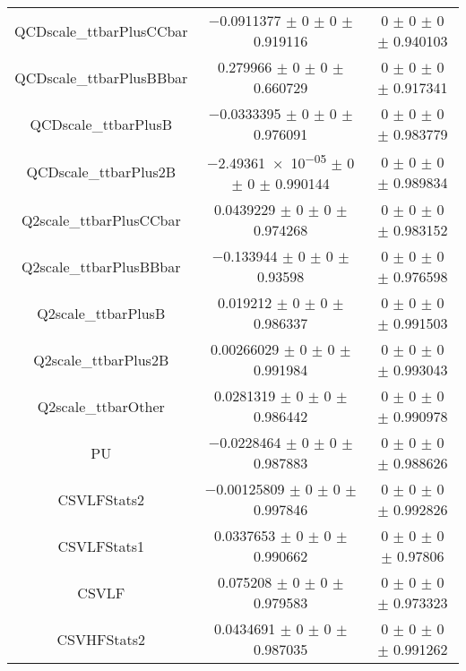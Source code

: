 \begin{table}
\begin{tabular}{ccc}
QCDscale\_ttbarPlusCCbar 	& \num{-0.0911377} $\pm$ \num{0} $\pm$ \num{0} $\pm$ \num{0.919116} 	& \num{0} $\pm$ \num{0} $\pm$ \num{0} $\pm$ \num{0.940103}\\
QCDscale\_ttbarPlusBBbar 	& \num{0.279966} $\pm$ \num{0} $\pm$ \num{0} $\pm$ \num{0.660729} 	& \num{0} $\pm$ \num{0} $\pm$ \num{0} $\pm$ \num{0.917341}\\
QCDscale\_ttbarPlusB 	& \num{-0.0333395} $\pm$ \num{0} $\pm$ \num{0} $\pm$ \num{0.976091} 	& \num{0} $\pm$ \num{0} $\pm$ \num{0} $\pm$ \num{0.983779}\\
QCDscale\_ttbarPlus2B 	& \num{-2.49361e-05} $\pm$ \num{0} $\pm$ \num{0} $\pm$ \num{0.990144} 	& \num{0} $\pm$ \num{0} $\pm$ \num{0} $\pm$ \num{0.989834}\\
Q2scale\_ttbarPlusCCbar 	& \num{0.0439229} $\pm$ \num{0} $\pm$ \num{0} $\pm$ \num{0.974268} 	& \num{0} $\pm$ \num{0} $\pm$ \num{0} $\pm$ \num{0.983152}\\
Q2scale\_ttbarPlusBBbar 	& \num{-0.133944} $\pm$ \num{0} $\pm$ \num{0} $\pm$ \num{0.93598} 	& \num{0} $\pm$ \num{0} $\pm$ \num{0} $\pm$ \num{0.976598}\\
Q2scale\_ttbarPlusB 	& \num{0.019212} $\pm$ \num{0} $\pm$ \num{0} $\pm$ \num{0.986337} 	& \num{0} $\pm$ \num{0} $\pm$ \num{0} $\pm$ \num{0.991503}\\
Q2scale\_ttbarPlus2B 	& \num{0.00266029} $\pm$ \num{0} $\pm$ \num{0} $\pm$ \num{0.991984} 	& \num{0} $\pm$ \num{0} $\pm$ \num{0} $\pm$ \num{0.993043}\\
Q2scale\_ttbarOther 	& \num{0.0281319} $\pm$ \num{0} $\pm$ \num{0} $\pm$ \num{0.986442} 	& \num{0} $\pm$ \num{0} $\pm$ \num{0} $\pm$ \num{0.990978}\\
PU 	& \num{-0.0228464} $\pm$ \num{0} $\pm$ \num{0} $\pm$ \num{0.987883} 	& \num{0} $\pm$ \num{0} $\pm$ \num{0} $\pm$ \num{0.988626}\\
CSVLFStats2 	& \num{-0.00125809} $\pm$ \num{0} $\pm$ \num{0} $\pm$ \num{0.997846} 	& \num{0} $\pm$ \num{0} $\pm$ \num{0} $\pm$ \num{0.992826}\\
CSVLFStats1 	& \num{0.0337653} $\pm$ \num{0} $\pm$ \num{0} $\pm$ \num{0.990662} 	& \num{0} $\pm$ \num{0} $\pm$ \num{0} $\pm$ \num{0.97806}\\
CSVLF 	& \num{0.075208} $\pm$ \num{0} $\pm$ \num{0} $\pm$ \num{0.979583} 	& \num{0} $\pm$ \num{0} $\pm$ \num{0} $\pm$ \num{0.973323}\\
CSVHFStats2 	& \num{0.0434691} $\pm$ \num{0} $\pm$ \num{0} $\pm$ \num{0.987035} 	& \num{0} $\pm$ \num{0} $\pm$ \num{0} $\pm$ \num{0.991262}\\

\end{tabular}
\end{table}
